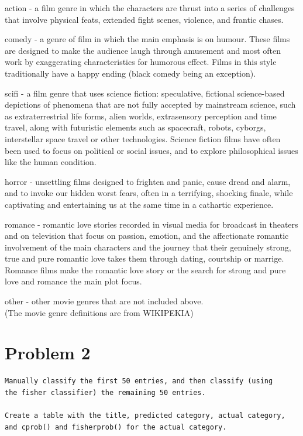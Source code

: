 \documentclass[12pt]{article}
\begin{document}
\noindent
action - a film genre in which the characters are thrust into a series of challenges that involve physical feats, extended fight scenes, violence, and frantic chases.

\noindent
comedy - a genre of film in which the main emphasis is on humour. These films are designed to make the audience laugh through amusement and most often work by exaggerating characteristics for humorous effect. Films in this style traditionally have a happy ending (black comedy being an exception).

\noindent
scifi - a film genre that uses science fiction: speculative, fictional science-based depictions of phenomena that are not fully accepted by mainstream science, such as extraterrestrial life forms, alien worlds, extrasensory perception and time travel, along with futuristic elements such as spacecraft, robots, cyborgs, interstellar space travel or other technologies. Science fiction films have often been used to focus on political or social issues, and to explore philosophical issues like the human condition.

\noindent
horror - unsettling films designed to frighten and panic, cause dread and alarm, and to invoke our hidden worst fears, often in a terrifying, shocking finale, while captivating and entertaining us at the same time in a cathartic experience.

\noindent
romance - romantic love stories recorded in visual media for broadcast in theaters and on television that focus on passion, emotion, and the affectionate romantic involvement of the main characters and the journey that their genuinely strong, true and pure romantic love takes them through dating, courtship or marrige. Romance films make the romantic love story or the search for strong and pure love and romance the main plot focus.

\noindent
other - other movie genres that are not included above.\\
(The movie genre definitions are from WIKIPEKIA)



\section*{Problem 2}

\begin{verbatim}
Manually classify the first 50 entries, and then classify (using
the fisher classifier) the remaining 50 entries. 

Create a table with the title, predicted category, actual category,
and cprob() and fisherprob() for the actual category.
\end{verbatim}
\end{document}
